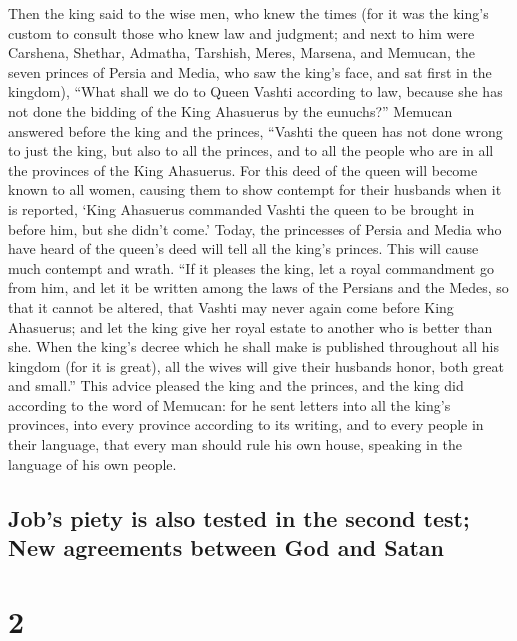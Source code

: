  Then the king said to the wise men, who knew the times
(for it was the king's custom to consult those who knew law and
judgment;  and next to him were Carshena, Shethar,
Admatha, Tarshish, Meres, Marsena, and Memucan, the seven princes of
Persia and Media, who saw the king's face, and sat first in the
kingdom),  ``What shall we do to Queen Vashti according
to law, because she has not done the bidding of the King Ahasuerus by
the eunuchs?''  Memucan answered before the king and the
princes, ``Vashti the queen has not done wrong to just the king, but
also to all the princes, and to all the people who are in all the
provinces of the King Ahasuerus.  For this deed of the
queen will become known to all women, causing them to show contempt for
their husbands when it is reported, `King Ahasuerus commanded Vashti the
queen to be brought in before him, but she didn't come.' 
Today, the princesses of Persia and Media who have heard of the queen's
deed will tell all the king's princes. This will cause much contempt and
wrath.  ``If it pleases the king, let a royal commandment
go from him, and let it be written among the laws of the Persians and
the Medes, so that it cannot be altered, that Vashti may never again
come before King Ahasuerus; and let the king give her royal estate to
another who is better than she.  When the king's decree
which he shall make is published throughout all his kingdom (for it is
great), all the wives will give their husbands honor, both great and
small.''  This advice pleased the king and the princes,
and the king did according to the word of Memucan:  for
he sent letters into all the king's provinces, into every province
according to its writing, and to every people in their language, that
every man should rule his own house, speaking in the language of his own
people.

\hypertarget{jobs-piety-is-also-tested-in-the-second-test-new-agreements-between-god-and-satan}{%
\subsection{Job's piety is also tested in the second test; New
agreements between God and
Satan}\label{jobs-piety-is-also-tested-in-the-second-test-new-agreements-between-god-and-satan}}

\hypertarget{section-1}{%
\section{2}\label{section-1}}

